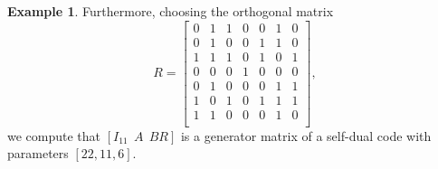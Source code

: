 \documentclass{article}
\theoremstyle{definition}
\newtheorem{example}{Example}[section]
\theoremstyle{remark}
\begin{document}
\begin{example}
    Furthermore, choosing the orthogonal matrix
    \[
    R=\left[\begin{array}{ccccccc}0 & 1 &1& 0& 0& 1& 0 \\
      0 &1 & 0 & 0 & 1& 1& 0 \\
      1& 1 &1& 0& 1 &0 &1 \\
      0 &0 &0 &1 &0& 0& 0 \\
      0& 1& 0& 0 &0 &1& 1 \\
      1 &0 &1& 0 &1& 1& 1 \\
      1 &1 &0& 0& 0& 1 &0 \\
    \end{array}\right],
    \]
    we compute that $\left[ I_{11} ~\ A ~\ B R \right]$ is a generator matrix of a self-dual code with parameters $[22,11,6]$.
\end{example}
\end{document}
